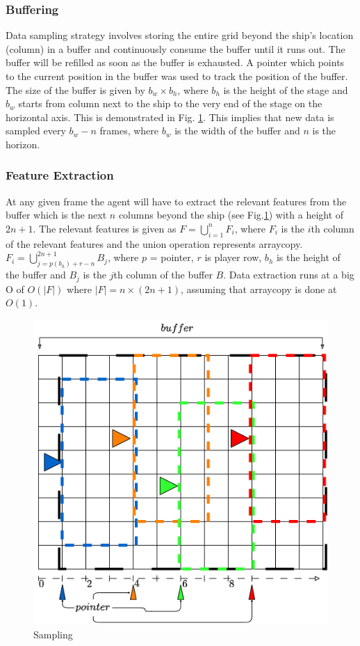 \documentclass[10pt,journal,compsoc]{IEEEtran}
\begin{document}
\subsubsection*{Buffering}
Data sampling strategy involves storing the entire grid beyond the ship's location (column) in a buffer and 
continuously consume the buffer until it runs out. The buffer will be refilled as soon as the buffer is 
exhausted. A pointer which points to the current position in the buffer was used to track the position of 
the buffer. The size of the buffer is given by $b_w \times b_h$, where $b_h$ is the height of the stage and 
$b_w$ starts from column next to the ship to the very end of the stage on the horizontal axis. 
This is demonstrated in Fig. \ref{fig:sampling}. This implies that new data is sampled every
$b_w - n$ frames, where $b_w$ is the width of the buffer and $n$ is the horizon. 
\subsubsection*{Feature Extraction} 
At any given frame the agent will have to extract the relevant features from the buffer which is the next $n$
columns beyond the ship (see Fig.\ref{fig:sampling}) with a height of $2n + 1$. The relevant features is given
as $F = \bigcup\limits_{i=1}^{n}F_i$, where $F_i$ is the $i$th column of the relevant features and the union 
operation represents arraycopy. $F_i = \bigcup\limits_{j = p(b_h) + r - n}^{2n + 1} B_j$, where $p$ = pointer,
 $r$ is player row, $b_h$ is the height of the buffer and $B_j$ is the $j$th column of the 
buffer $B$. Data extraction runs at a big O of $O(|F|)$ where $|F|=n \times (2n+1)$, assuming that arraycopy
is done at $O(1)$.


\begin{figure}
    \centering
    \includegraphics[width=\linewidth]{sampling.png}
    \caption{Sampling}
    \label{fig:sampling}
\end{figure}
\end{document}
